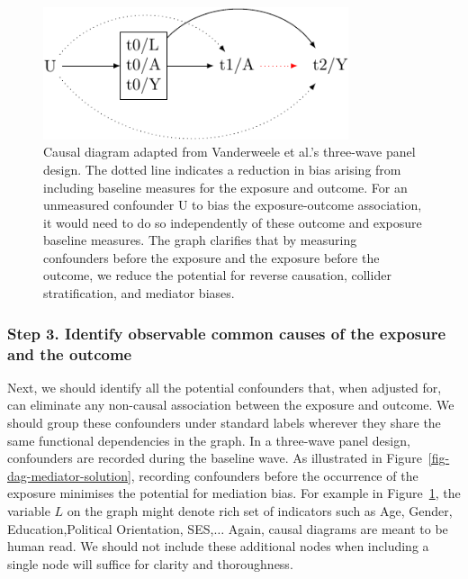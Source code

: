 \documentclass[
  singlecolumn]{article}
\begin{document}
\begin{figure}

{\centering \includegraphics[width=0.8\textwidth,height=\textheight]{causal-dags_files/figure-pdf/fig-dag-6-1.pdf}

}

\caption{\label{fig-dag-6}Causal diagram adapted from Vanderweele et
al.'s three-wave panel design. The dotted line indicates a reduction in
bias arising from including baseline measures for the exposure and
outcome. For an unmeasured confounder U to bias the exposure-outcome
association, it would need to do so independently of these outcome and
exposure baseline measures. The graph clarifies that by measuring
confounders before the exposure and the exposure before the outcome, we
reduce the potential for reverse causation, collider stratification, and
mediator biases.}

\end{figure}

\hypertarget{step-3.-identify-observable-common-causes-of-the-exposure-and-the-outcome}{%
\subsubsection{Step 3. Identify observable common causes of the exposure
and the
outcome}\label{step-3.-identify-observable-common-causes-of-the-exposure-and-the-outcome}}

Next, we should identify all the potential confounders that, when
adjusted for, can eliminate any non-causal association between the
exposure and outcome. We should group these confounders under standard
labels wherever they share the same functional dependencies in the
graph. In a three-wave panel design, confounders are recorded during the
baseline wave. As illustrated in Figure~\ref{fig-dag-mediator-solution},
recording confounders before the occurrence of the exposure minimises
the potential for mediation bias. For example in Figure~\ref{fig-dag-6},
the variable \(L\) on the graph might denote rich set of indicators such
as Age, Gender, Education,Political Orientation, SES,\(\dots\) Again,
causal diagrams are meant to be human read. We should not include these
additional nodes when including a single node will suffice for clarity
and thoroughness.
\end{document}
